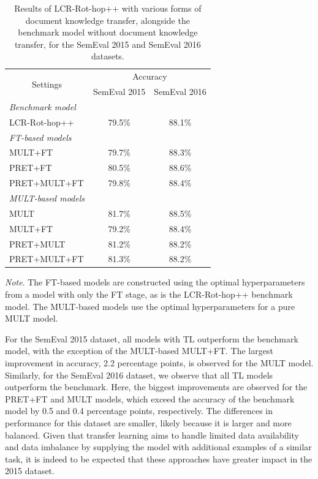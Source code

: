 \begin{table}[h]
\caption{Results of LCR-Rot-hop++ with various forms of document knowledge transfer, alongside the benchmark model without document knowledge transfer, for the SemEval 2015 and SemEval 2016 datasets.}
\label{tab:resultsModel}
\setlength{\tabcolsep}{38pt}
\begin{tabular}{@{}lcc@{}}
\toprule
\multicolumn{1}{c}{\multirow{2}{*}{Settings}} & \multicolumn{2}{c}{Accuracy} \\ \cmidrule(l){2-3} 
\multicolumn{1}{c}{}                          & SemEval 2015  & SemEval 2016 \\ \midrule
\textit{Benchmark model}                      &               &              \\
LCR-Rot-hop++                                 & 79.5\%        & 88.1\%       \\ \midrule
\textit{FT-based models}                      &               &              \\
MULT+FT                                       & 79.7\%        & 88.3\%       \\
PRET+FT                                       & 80.5\%        & 88.6\%       \\
PRET+MULT+FT                                  & 79.8\%         & 88.4\%       \\ \midrule
\textit{MULT-based models}                    &               &              \\
MULT                                          & 81.7\%        & 88.5\%       \\
MULT+FT                                       & 79.2\%        & 88.4\%       \\
PRET+MULT                                     & 81.2\%        & 88.2\%       \\
PRET+MULT+FT                                  & 81.3\%        & 88.2\%       \\ \bottomrule
\end{tabular}
\footnotesize\textit{Note}. The FT-based models are constructed using the optimal hyperparameters from a model with only the FT stage, as is the LCR-Rot-hop++ benchmark model. The MULT-based models use the optimal hyperparameters for a pure MULT model.
\vspace{-3mm}
\end{table}
For the SemEval 2015 dataset, all models with TL outperform the benchmark model, with the exception of the MULT-based MULT+FT. The largest improvement in accuracy, 2.2 percentage points, is observed for the MULT model. Similarly, for the SemEval 2016 dataset, we observe that all TL models outperform the benchmark. Here, the biggest improvements are observed for the PRET+FT and MULT models, which exceed the accuracy of the benchmark model by 0.5 and 0.4 percentage points, respectively. The differences in performance for this dataset are smaller, likely because it is larger and more balanced. Given that transfer learning aims to handle limited data availability and data imbalance by supplying the model with additional examples of a similar task, it is indeed to be expected that these approaches have greater impact in the 2015 dataset. 

